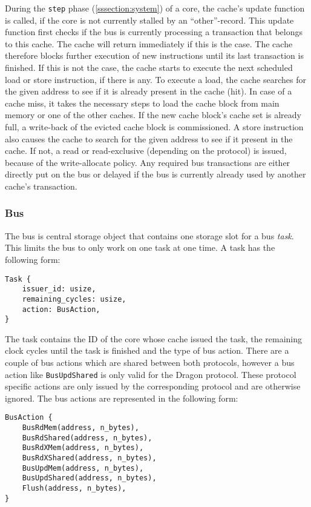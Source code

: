 During the \texttt{step} phase (\ref{sssection:system}) of a core, the cache's update function is
called, if the core is not currently stalled by an ``other''-record. This update function first checks if
the bus is currently processing a transaction that belongs to this cache. The cache will return
immediately if this is the case. The cache therefore blocks further execution of new instructions
until its last transaction is finished. If this is not the case, the cache starts to execute the
next scheduled load or store instruction, if there is any. To execute a load, the cache searches
for the given address to see if it is already present in the cache (hit). In case of a cache miss,
it takes the necessary steps to load the cache block from main memory or one of the other caches.
If the new cache block's cache set is already full, a write-back of the evicted cache block is
commissioned. A store instruction also causes the cache to search for the given address to see if it
present in the cache. If not, a read or read-exclusive (depending on the protocol) is issued,
because of the write-allocate policy. Any required bus transactions are either directly put on the
bus or delayed if the bus is currently already used by another cache's transaction.

\subsubsection{Bus}

The bus is central storage object that contains one storage slot for a bus \emph{task}.
This limits the bus to only work on one task at one time. A task has the following form:

\begin{lstlisting}
Task {
    issuer_id: usize,
    remaining_cycles: usize,
    action: BusAction,
}
\end{lstlisting}

The task contains the ID of the core whose cache issued the task, the remaining clock cycles until
the task is finished and the type of bus action. There are a couple of bus actions which are shared
between both protocols, however a bus action like \texttt{BusUpdShared} is only valid for the
Dragon protocol. These protocol specific actions are only issued by the corresponding protocol and
are otherwise ignored. The bus actions are
represented in the following form:

\begin{lstlisting}
BusAction {
    BusRdMem(address, n_bytes),
    BusRdShared(address, n_bytes),
    BusRdXMem(address, n_bytes),
    BusRdXShared(address, n_bytes),
    BusUpdMem(address, n_bytes),
    BusUpdShared(address, n_bytes),
    Flush(address, n_bytes),
}
\end{lstlisting}

